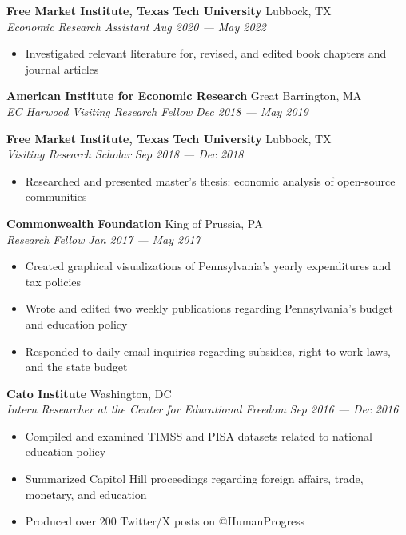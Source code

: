 \documentclass[a4paper,11pt]{article}
\begin{document}
\textbf{Free Market Institute, Texas Tech University} \hfill Lubbock, TX\\
\textit{Economic Research Assistant} \hfill  \emph{Aug 2020 --- May 2022} \\
\begin{itemize}
    \item Investigated relevant literature for, revised, and edited book chapters and journal articles
\end{itemize}
\vspace{1mm}

\textbf{American Institute for Economic Research} \hfill Great Barrington, MA\\
\textit{EC Harwood Visiting Research Fellow} \hfill  \emph{Dec 2018 --- May 2019}\\
\vspace{1mm}

\textbf{Free Market Institute, Texas Tech University} \hfill Lubbock, TX\\
\textit{Visiting Research Scholar} \hfill  \emph{Sep 2018 --- Dec 2018}\\
\begin{itemize}
    \item Researched and presented master's thesis: economic analysis of open-source communities
\end{itemize}
\vspace{1mm}

\textbf{Commonwealth Foundation} \hfill King of Prussia, PA\\
\textit{Research Fellow} \hfill  \emph{Jan 2017 --- May 2017}\\
\begin{itemize}
    \item Created graphical visualizations of Pennsylvania's yearly expenditures and tax policies
    \item Wrote and edited two weekly publications regarding Pennsylvania's budget and education policy
    \item Responded to daily email inquiries regarding subsidies, right-to-work laws, and the state budget
\end{itemize}
\vspace{1mm}

\textbf{Cato Institute} \hfill Washington, DC\\
\textit{Intern Researcher at the Center for Educational Freedom} \hfill \emph{Sep 2016 --- Dec 2016}\\
\begin{itemize}
    \item Compiled and examined TIMSS and PISA datasets related to national education policy
    \item Summarized Capitol Hill proceedings regarding foreign affairs, trade, monetary, and education
    \item Produced over 200 Twitter/X posts on @HumanProgress
\end{itemize}
\vspace{1mm}
\end{document}
